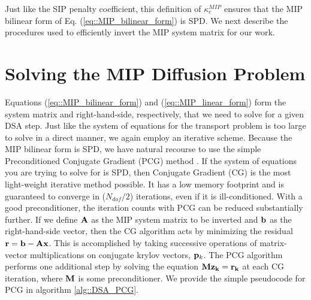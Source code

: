 \noindent Just like the SIP penalty coefficient, this definition of $\kappa_e^{MIP}$ ensures that the MIP bilinear form of Eq. (\ref{eq::MIP_bilinear_form}) is SPD. We next describe the procedures used to efficiently invert the MIP system matrix for our work.

\section{Solving the MIP Diffusion Problem}
\label{sec::DSA_Solving}

Equations (\ref{eq::MIP_bilinear_form}) and (\ref{eq::MIP_linear_form}) form the system matrix and right-hand-side, respectively, that we need to solve for a given DSA step. Just like the system of equations for the transport problem is too large to solve in a direct manner, we again employ an iterative scheme. Because the MIP bilinear form is SPD, we have natural recourse to use the simple Preconditioned Conjugate Gradient (PCG) method \cite{saad2003iterative}. If the system of equations you are trying to solve for is SPD, then Conjugate Gradient (CG) is the most light-weight iterative method possible. It has a low memory footprint and is guaranteed to converge in ($N_{dof}/2$) iterations, even if it is ill-conditioned. With a good preconditioner, the iteration counts with PCG can be reduced substantially further. If we define ${\bf A}$ as the MIP system matrix to be inverted and ${\bf b}$ as the right-hand-side vector, then the CG algorithm acts by minimizing the residual ${\bf r} = {\bf b} - {\bf A} {\bf x}$. This is accomplished by taking successive operations of matrix-vector multiplications on conjugate krylov vectors, ${\bf p}_k$. The PCG algorithm performs one additional step by solving the equation ${\bf M} {\bf z_k} = {\bf r_k}$ at each CG iteration, where ${\bf M}$ is some preconditioner. We provide the simple pseudocode for PCG in algorithm \ref{alg::DSA_PCG}.

